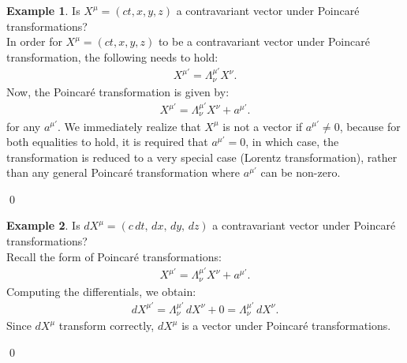 \documentclass{book}
\theoremstyle{definition}
\newtheorem{exmp}{Example}[section]
\begin{document}
\begin{exmp}
	Is $X^\mu = (ct,x,y,z)$ a contravariant vector under Poincar\'e transformations?\\
	
	In order for $X^\mu = (ct,x,y,z)$ to be a contravariant vector under Poincar\'e transformation, the following needs to hold:
	\begin{align*}
	X^{\mu'} = \Lambda^{\mu'}_\nu X^\nu.
	\end{align*}
	Now, the Poincar\'e transformation is given by:
	\begin{align*}
	X^{\mu'} = \Lambda^{\mu'}_\nu X^\nu + a^{\mu'}.
	\end{align*}
	for any $a^{\mu'}$. We immediately realize that $X^\mu$ is not a vector if $a^{\mu'} \neq 0$, because for both equalities to hold, it is required that $a^{\mu'} = 0$, in which case, the transformation is reduced to a very special case (Lorentz transformation), rather than any general Poincar\'e transformation where $a^{\mu'}$ can be non-zero.  	\\
\end{exmp}\qed

\begin{exmp}
	Is $dX^\mu = (c\,dt, \,dx, \,dy, \,dz)$ a contravariant vector under Poincar\'e transformations?\\
	
	Recall the form of Poincar\'e transformations:
	\begin{align*}
	X^{\mu'} = \Lambda^{\mu'}_\nu X^\nu + a^{\mu'}.
	\end{align*}
	Computing the differentials, we obtain:
	\begin{align*}
	dX^{\mu'} = \Lambda^{\mu'}_\nu\,dX^\nu + 0 = \Lambda^{\mu'}_\nu\,dX^\nu.
	\end{align*}
	Since $dX^{\mu}$ transform correctly, $dX^\mu$ is a vector under Poincar\'e transformations. \\
\end{exmp}\qed
\end{document}
